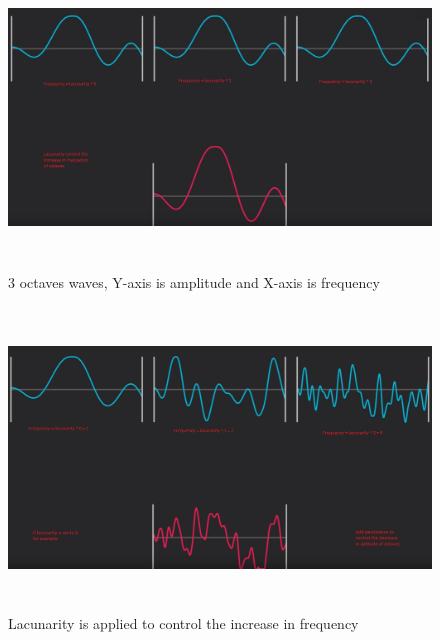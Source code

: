 \documentclass[a4paper,12pt]{book}
\begin{document}
\begin{figure}
\begin{center}
\includegraphics[height=80mm]{3noise-maps-octaves-3.png}
\end{center}
\caption{3 octaves waves, Y-axis is amplitude and X-axis is frequency}
\label{fig:pretty}
\end{figure}

\begin{figure}
\begin{center}
\includegraphics[height=80mm]{3noise-maps-octaves-4.png}
\end{center}
\caption{Lacunarity is applied to control the increase in frequency}
\label{fig:pretty}
\end{figure}
\end{document}
